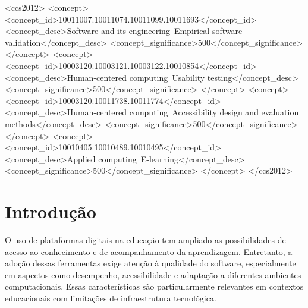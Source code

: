 \documentclass[sigconf, language=english, language=brazilian,natbib=false]{acmart}
\begin{document}
\begin{CCSXML}
<ccs2012>
<concept>
<concept_id>10011007.10011074.10011099.10011693</concept_id>
<concept_desc>Software and its engineering~Empirical software validation</concept_desc>
<concept_significance>500</concept_significance>
</concept>
<concept>
<concept_id>10003120.10003121.10003122.10010854</concept_id>
<concept_desc>Human-centered computing~Usability testing</concept_desc>
<concept_significance>500</concept_significance>
</concept>
<concept>
<concept_id>10003120.10011738.10011774</concept_id>
<concept_desc>Human-centered computing~Accessibility design and evaluation methods</concept_desc>
<concept_significance>500</concept_significance>
</concept>
<concept>
<concept_id>10010405.10010489.10010495</concept_id>
<concept_desc>Applied computing~E-learning</concept_desc>
<concept_significance>500</concept_significance>
</concept>
</ccs2012>
\end{CCSXML}



\maketitle


\section{Introdução}
O uso de plataformas digitais na educação tem ampliado as possibilidades de acesso ao conhecimento e de acompanhamento da aprendizagem. Entretanto, a adoção dessas ferramentas exige atenção à qualidade do software, especialmente em aspectos como desempenho, acessibilidade e adaptação a diferentes ambientes computacionais. Essas características são particularmente relevantes em contextos educacionais com limitações de infraestrutura tecnológica.
\end{document}
